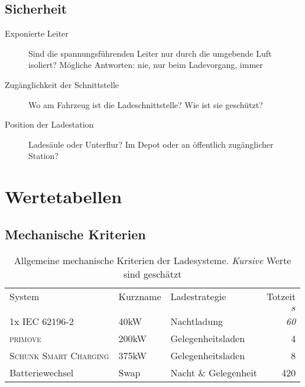 \subsection{Sicherheit}
\begin{description}
	\item [Exponierte Leiter]
	Sind die spannungsführenden Leiter nur durch die umgebende Luft isoliert? Mögliche Antworten: nie, nur beim Ladevorgang, immer
	\item [Zugänglichkeit der Schnittstelle]
	Wo am Fahrzeug ist die Ladeschnittstelle? Wie ist sie geschützt?
	\item [Position der Ladestation]
	Ladesäule oder Unterflur? Im Depot oder an öffentlich zugänglicher Station?	
\end{description}


\section{Wertetabellen}
\label{sec_tabellen_ladesysteme}
\FloatBarrier
\subsection{Mechanische Kriterien}
\begin{table}[h!]\centering
	\begin{tabularx}{\textwidth}{lXlr}
		\toprule
		System                         & Kurzname & Ladestrategie        & Totzeit \\
		                               &          &                      & $s$     \\ \midrule
		1x \textsc{IEC 62196-2}        & 40kW     & Nachtladung  & \emph{60} \\
		\textsc{primove}               & 200kW    & Gelegenheitsladen    & 4 \\
		\textsc{Schunk Smart Charging} & 375kW    & Gelegenheitsladen    & 8 \\
		Batteriewechsel                & Swap     & Nacht \& Gelegenheit & 420 \\ \bottomrule
	\end{tabularx}
	\caption[Allgemeine mechanische Kriterien der Ladesysteme]{Allgemeine mechanische Kriterien der Ladesysteme. \emph{Kursive} Werte sind geschätzt}
	\label{tab_mech_Ladesys_allg}
\end{table}

